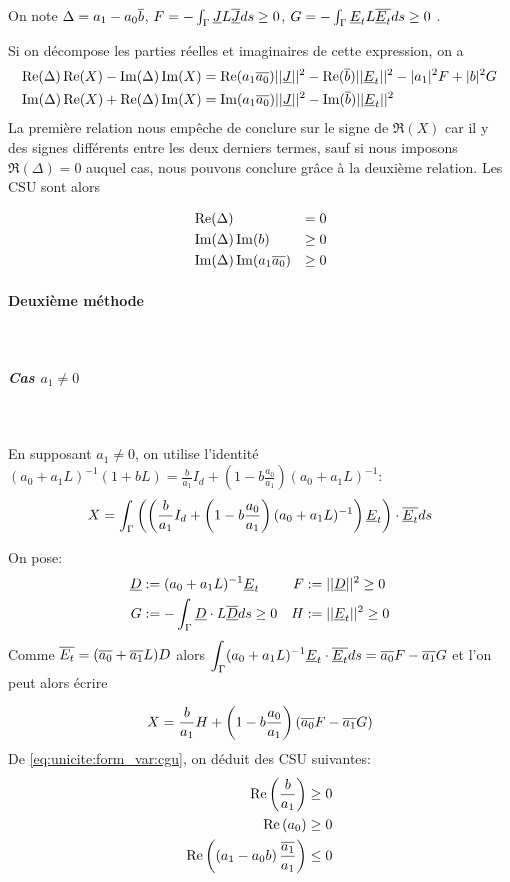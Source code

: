 On note $\Delta = a_1 -a_0{\overline{b}}$, $F = -\int_\Gamma \underline{J} L {\overline{\underline{J}}} ds \ge 0 $, $G = -\int_\Gamma \underline{E}_t L {\overline{\underline{E}_t}} ds \ge 0 $ . 

Si on décompose les parties réelles et imaginaires de cette expression, on a
\begin{align*}
\operatorname{Re}(\Delta)\operatorname{Re}(X) - \operatorname{Im}(\Delta)\operatorname{Im}(X) &= \operatorname{Re}(a_1{\overline{a_0}}) ||\underline{J}||^2 - \operatorname{Re}({\overline{b}})||\underline{E}_t||^2 -|a_1|^2 F + |b|^2 G \\
\operatorname{Im}(\Delta)\operatorname{Re}(X) + \operatorname{Re}(\Delta)\operatorname{Im}(X) &= \operatorname{Im}(a_1{\overline{a_0}}) ||\underline{J}||^2 - \operatorname{Im}({\overline{b}})||\underline{E}_t||^2
\end{align*}
La première relation nous empêche de conclure sur le signe de $\Re(X)$ car il y des signes différents entre les deux derniers termes, sauf si nous imposons $\Re( \Delta)= 0$ auquel cas, nous pouvons conclure grâce à la deuxième relation. Les CSU sont alors

\begin{align}
&\operatorname{Re}(\Delta) &= 0\\
&\operatorname{Im}(\Delta)\operatorname{Im}(b) &\ge 0\\
&\operatorname{Im}(\Delta)\operatorname{Im}(a_1{\overline{a_0}})&\ge 0
\end{align}

\paragraph{Deuxième méthode}
~
\subparagraph{Cas $a_1\not=0$}
~

En supposant $a_1 \not=0$, on utilise l'identité $(a_0 + a_1 L)^{-1}(1 + b L)  = \frac{b}{a_1} I_d + \left(1-b\frac{a_0}{a_1}\right)(a_0+a_1L)^{-1}$:
\[
X = \int_\Gamma \left(\left(\dfrac{b}{a_1} I_d + \left(1-b\dfrac{a_0}{a_1}\right)(a_0+a_1L)^{-1}\right)\underline{E}_t\right) \cdot {\overline{\underline{E}_t}} ds
\]

On pose:
\begin{align*}
\underline{D} &:= (a_0 + a_1 L)^{-1}\underline{E}_t & F&:= || \underline{D} || ^2 \ge 0  \\
G&:= -\int_\Gamma \underline{D} \cdot L{\overline{\underline{D}}} ds \ge 0 & H &:= || \underline{E}_t || ^2 \ge 0
\end{align*}
Comme ${\overline{E_t}} = ({\overline{a_0}} + {\overline{a_1}}L)D$ alors $\displaystyle\int_\Gamma (a_0 +a_1 L) ^{-1}\underline{E}_t\cdot {\overline{\underline{E}_t}} ds = {\overline{a_0}} F - {\overline{a_1}} G$ et l'on peut alors écrire

\begin{equation}
\label{eq:unicite:form_var:decomp_cgu_ci1_a1}
X = \dfrac{b}{a_1}H   + \left(1-b\dfrac{a_0}{a_1}\right)\left({\overline{a_0}} F - {\overline{a_1}} G\right)
\end{equation}
De \eqref{eq:unicite:form_var:cgu}, on déduit des CSU suivantes:
\begin{align}
\operatorname{Re}\left(\dfrac{b}{a_1}\right) \ge 0 \\
\operatorname{Re}\left(a_0\right) \ge 0 \\
\operatorname{Re}\left(\left(a_1-a_0 b\right)\dfrac{{\overline{a_1}}}{a_1}\right) \le 0
\end{align}


